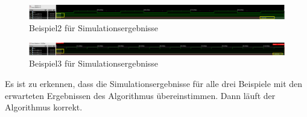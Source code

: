 \begin{figure}[H]
    \centering
    \includegraphics[width=1.0\textwidth]{images/bs2result.png}
    \caption[Beispiel2 für Simulationsergebnisse]{Beispiel2 für Simulationsergebnisse}
    \label{fig:bs2result}
\end{figure}

\begin{figure}[H]
    \centering
    \includegraphics[width=1.0\textwidth]{images/bs3result.png}
    \caption[Beispiel3 für Simulationsergebnisse]{Beispiel3 für Simulationsergebnisse}
    \label{fig:bs3result}
\end{figure}

\noindent Es ist zu erkennen, dass die Simulationsergebnisse für alle drei Beispiele mit den erwarteten Ergebnissen des Algorithmus übereinstimmen. Dann läuft der Algorithmus korrekt.
\cleardoublepage
